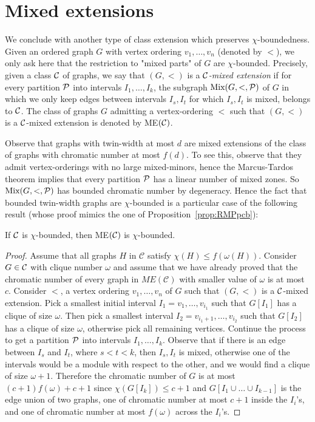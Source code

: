 \section{Mixed extensions}

We conclude with another type of class extension which preserves  $\chi$-boundedness. Given an ordered graph $G$ with vertex ordering  $v_1,\dots ,v_n$ (denoted by $<$), we only ask here that the restriction to "mixed parts" of $G$ are $\chi$-bounded. Precisely, given a class $\cal C$ of graphs, we say that $(G,<)$ is a \emph{$\cal C$-mixed extension} if for every partition $\cal P$ into intervals $I_1,\dots ,I_k$, the subgraph $\text{Mix}(G,<,\cal P)$ of $G$ in which we only keep edges between intervals $I_s,I_t$ for which $I_s,I_t$ is mixed, belongs to $\cal C$. The class of graphs $G$ admitting a vertex-ordering $<$ such that $(G,<)$ is a $\cal C$-mixed extension is denoted by ME$(\cal C)$.

Observe that graphs with twin-width at most $d$ are mixed extensions of the class of graphs with chromatic number at most $f(d)$. To see this, observe that they admit vertex-orderings with no large mixed-minors, hence the Marcus-Tardos theorem implies that every partition $\cal P$ has a linear number of mixed zones. So $\text{Mix}(G,<,\cal P)$ has bounded chromatic number by degeneracy. Hence the fact that bounded twin-width graphs are $\chi$-bounded is a particular case of the following result (whose proof mimics the one of Proposition~\ref{prop:RMPpcb}):



\begin{theorem}\label{th:chimix}
If $\cal C$ is $\chi$-bounded, then ME$(\cal C)$ is $\chi$-bounded.
\end{theorem}

\begin{proof} Assume that all graphs $H$ in $\mathcal{C}$ satisfy $\chi(H)\leq f(\omega (H))$. Consider $G\in \cal C$ with clique number $\omega$ and assume that we have already proved that the chromatic number of every graph in $ME(\mathcal{C})$ with smaller value of $\omega$ is at most $c$. Consider $<$, a vertex ordering $v_1,\dots ,v_n$ of $G$ such that $(G,<)$ is a $\cal C$-mixed extension. Pick a smallest initial interval $I_1=v_1,\dots ,v_{i_1}$ such that $G[I_1]$ has a clique of size $\omega$. Then pick a smallest interval $I_2=v_{i_1+1},\dots ,v_{i_2}$ such that $G[I_2]$ has a clique of size $\omega$, otherwise pick all remaining vertices. Continue the process to get a partition $\cal P$ into intervals $I_1,\dots ,I_k$. Observe that if there is an edge between $I_s$ and $I_t$, where $s<t<k$, then $I_s,I_t$ is mixed, otherwise one of the intervals would be a module with respect to the other, and we would find a clique of size $\omega +1$. Therefore the chromatic number of $G$ is at most $(c+1)f(\omega )+c+1$ since $\chi(G[I_k])\leq c+1$ and  $G[I_1\cup \dots \cup I_{k-1}]$ is the edge union of two graphs, one of chromatic number at most $c+1$ inside the $I_i$'s, and one of chromatic number at most $f(\omega)$ across the $I_i$'s.
\end{proof}
